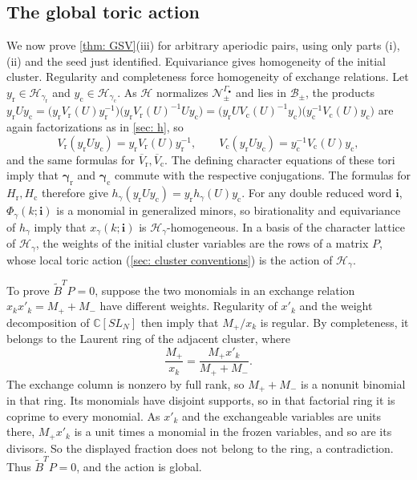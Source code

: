 \documentclass[a4paper]{amsart}
\numberwithin{equation}{section}
\theoremstyle{definition}
\theoremstyle{remark}
\newcommand{\bbC}{\mathbb{C}}
\newcommand{\mcH}{\mathcal{H}}
\newcommand{\mcN}{\mathcal{N}}
\newcommand{\mcB}{\mathcal{B}}
\newcommand{\bfi}{\mathbf{i}}
\newcommand{\tB}{\widetilde{B}}
\newcommand{\rr}{\mathrm{r}}
\newcommand{\cc}{\mathrm{c}}
\begin{document}
\subsection{The global toric action}
\label{sec: toric A}
We now prove \cref{thm: GSV}(iii) for arbitrary aperiodic pairs, using only parts (i), (ii) and the seed just identified.
Equivariance gives homogeneity of the initial cluster.
Regularity and completeness force homogeneity of exchange relations.
Let $y_{\rr}\in\mcH_{\gamma_{\rr}}$ and $y_{\cc}\in\mcH_{\gamma_{\cc}}$.
As $\mcH$ normalizes $\mcN_\pm^{\Gamma_\bullet}$ and lies in $\mcB_\pm$, the products $y_{\rr}Uy_{\cc}=\big(y_{\rr}V_{\rr}(U)y_{\rr}^{-1}\big)\big(y_{\rr}V_{\rr}(U)^{-1}Uy_{\cc}\big)=\big(y_{\rr}UV_{\cc}(U)^{-1}y_{\cc}\big)\big(y_{\cc}^{-1}V_{\cc}(U)y_{\cc}\big)$ are again factorizations as in \cref{sec: h}, so
\[
  V_{\rr}(y_{\rr}Uy_{\cc})=y_{\rr}V_{\rr}(U)y_{\rr}^{-1},\qquad V_{\cc}(y_{\rr}Uy_{\cc})=y_{\cc}^{-1}V_{\cc}(U)y_{\cc},
\]
and the same formulas for $\overline{V}_{\rr},\overline{V}_{\cc}$.
The defining character equations of these tori imply that $\boldsymbol\gamma_{\rr}$ and $\boldsymbol\gamma_{\cc}$ commute with the respective conjugations.
The formulas for $H_{\rr},H_{\cc}$ therefore give $h_\gamma(y_{\rr}Uy_{\cc})=y_{\rr}h_\gamma(U)y_{\cc}$.
For any double reduced word $\bfi$, $\Phi_\gamma(k;\bfi)$ is a monomial in generalized minors, so birationality and equivariance of $h_\gamma$ imply that $x_\gamma(k;\bfi)$ is $\mcH_\gamma$-homogeneous.
In a basis of the character lattice of $\mcH_\gamma$, the weights of the initial cluster variables are the rows of a matrix $P$, whose local toric action (\cref{sec: cluster conventions}) is the action of $\mcH_\gamma$.

To prove $\tB^TP=0$, suppose the two monomials in an exchange relation $x_kx'_k=M_++M_-$ have different weights.
Regularity of $x'_k$ and the weight decomposition of $\bbC[SL_N]$ then imply that $M_+/x_k$ is regular.
By completeness, it belongs to the Laurent ring of the adjacent cluster, where
\[
  \frac{M_+}{x_k}=\frac{M_+x'_k}{M_++M_-}.
\]
The exchange column is nonzero by full rank, so $M_++M_-$ is a nonunit binomial in that ring.
Its monomials have disjoint supports, so in that factorial ring it is coprime to every monomial.
As $x'_k$ and the exchangeable variables are units there, $M_+x'_k$ is a unit times a monomial in the frozen variables, and so are its divisors.
So the displayed fraction does not belong to the ring, a contradiction.
Thus $\tB^TP=0$, and the action is global.
\end{document}
